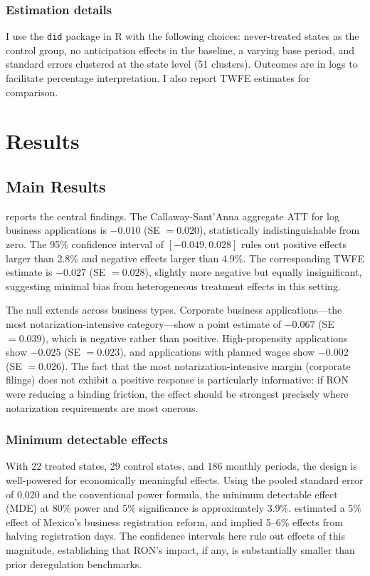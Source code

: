 \documentclass[12pt]{article}
\begin{document}
\subsubsection*{Estimation details} I use the \texttt{did} package in R \citep{callaway2021did_package} with the following choices: never-treated states as the control group, no anticipation effects in the baseline, a varying base period, and standard errors clustered at the state level (51 clusters). Outcomes are in logs to facilitate percentage interpretation. I also report TWFE estimates for comparison.


\section{Results}

\subsection{Main Results}

 reports the central findings. The Callaway-Sant'Anna aggregate ATT for log business applications is $-0.010$ (SE $= 0.020$), statistically indistinguishable from zero. The 95\% confidence interval of $[-0.049, 0.028]$ rules out positive effects larger than 2.8\% and negative effects larger than 4.9\%. The corresponding TWFE estimate is $-0.027$ (SE $= 0.028$), slightly more negative but equally insignificant, suggesting minimal bias from heterogeneous treatment effects in this setting.



The null extends across business types. Corporate business applications---the most notarization-intensive category---show a point estimate of $-0.067$ (SE $= 0.039$), which is negative rather than positive. High-propensity applications show $-0.025$ (SE $= 0.023$), and applications with planned wages show $-0.002$ (SE $= 0.026$). The fact that the most notarization-intensive margin (corporate filings) does not exhibit a positive response is particularly informative: if RON were reducing a binding friction, the effect should be strongest precisely where notarization requirements are most onerous.

\subsubsection*{Minimum detectable effects} With 22 treated states, 29 control states, and 186 monthly periods, the design is well-powered for economically meaningful effects. Using the pooled standard error of 0.020 and the conventional power formula, the minimum detectable effect (MDE) at 80\% power and 5\% significance is approximately 3.9\%. \citet{bruhn2011} estimated a 5\% effect of Mexico's business registration reform, and \citet{djankov2002regulation} implied 5--6\% effects from halving registration days. The confidence intervals here rule out effects of this magnitude, establishing that RON's impact, if any, is substantially smaller than prior deregulation benchmarks.
\end{document}
